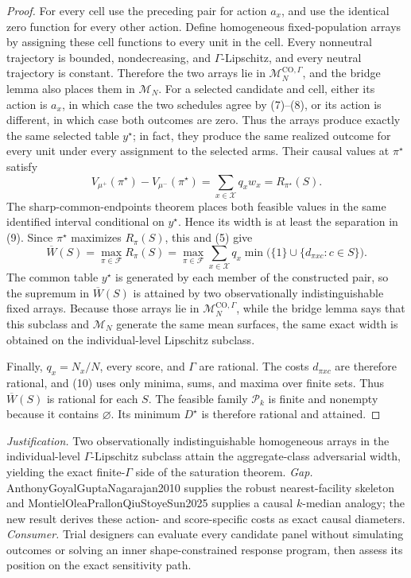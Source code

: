 \documentclass{article}
\begin{document}
\begin{proof}
For every cell use the preceding pair for action \(a_x\), and use the
identical zero function for every other action.  Define homogeneous
fixed-population arrays by assigning these cell functions to every unit in
the cell.  Every nonneutral trajectory is bounded, nondecreasing, and
\(\Gamma\)-Lipschitz, and every neutral trajectory is constant.  Therefore
the two arrays lie in \(\mathcal M_N^{\mathrm{CO},\Gamma}\), and the bridge
lemma also places them in \(\mathcal M_N\).  For a selected candidate and
cell, either its action is \(a_x\), in which case the two schedules agree by
(7)--(8), or its action is different, in which case both outcomes are zero.
Thus the arrays produce exactly the same selected table \(y^\star\); in
fact, they produce the same realized outcome for every unit under every
assignment to the selected arms.  Their causal values at \(\pi^\star\)
satisfy
\[
V_{\mu^+}(\pi^\star)-V_{\mu^-}(\pi^\star)
=\sum_{x\in\mathcal X}q_xw_x
=R_{\pi^\star}(S).                                                   \tag{9}
\]
The sharp-common-endpoints theorem places both feasible values in the same
identified interval conditional on \(y^\star\).  Hence its width is at least
the separation in (9).  Since \(\pi^\star\) maximizes \(R_\pi(S)\), this
and (5) give
\[
\overline W(S)
=\max_{\pi\in\mathcal F}R_\pi(S)
=\max_{\pi\in\mathcal F}\sum_{x\in\mathcal X}q_x
\min\bigl(\{1\}\cup\{d_{\pi xc}:c\in S\}\bigr).                \tag{10}
\]
The common table \(y^\star\) is generated by each member of the constructed
pair, so the supremum in \(\overline W(S)\) is attained by two
observationally indistinguishable fixed arrays.  Because those arrays lie in
\(\mathcal M_N^{\mathrm{CO},\Gamma}\), while the bridge lemma says that
this subclass and \(\mathcal M_N\) generate the same mean surfaces, the
same exact width is obtained on the individual-level Lipschitz subclass.

Finally, \(q_x=N_x/N\), every score, and \(\Gamma\) are rational.  The
costs \(d_{\pi xc}\) are therefore rational, and (10) uses only minima,
sums, and maxima over finite sets.  Thus \(\overline W(S)\) is rational for
each \(S\).  The feasible family \(\mathcal P_k\) is finite and nonempty
because it contains \(\varnothing\).  Its minimum \(D^\star\) is therefore
rational and attained.
\end{proof}
\par\smallskip\noindent \textit{Justification.} Two observationally indistinguishable homogeneous arrays in the individual-level \(\Gamma\)-Lipschitz subclass attain the aggregate-class adversarial width, yielding the exact finite-\(\Gamma\) side of the saturation theorem. \textit{Gap.} AnthonyGoyalGuptaNagarajan2010 supplies the robust nearest-facility skeleton and MontielOleaPrallonQiuStoyeSun2025 supplies a causal \(k\)-median analogy; the new result derives these action- and score-specific costs as exact causal diameters. \textit{Consumer.} Trial designers can evaluate every candidate panel without simulating outcomes or solving an inner shape-constrained response program, then assess its position on the exact sensitivity path.
\end{document}
